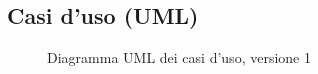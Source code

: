 \subsection{Casi d'uso (UML)}
\vspace{0.5cm}
\begin{figure}[H]
    \centering
    \caption{Diagramma UML dei casi d'uso, versione 1}
    \label{fig:use_case_uml_v1}
\end{figure}